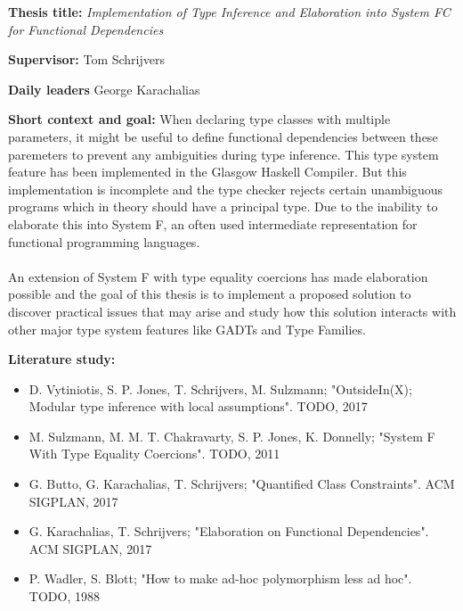 \documentclass[12pt]{report}
\begin{document}
\pagestyle{myheadings}

{\bf Thesis title:} {\em Implementation of Type Inference and Elaboration into System FC for Functional Dependencies}

\vspace{0.5cm}
{\bf Supervisor:} Tom Schrijvers


\vspace{0.5cm}
{\bf Daily leaders} George Karachalias

\vspace{1cm}
{\bf Short context and goal: }
When declaring type classes with multiple parameters, it might be useful to
define functional dependencies between these paremeters to prevent any
ambiguities during type inference. This type system feature has been implemented
in the Glasgow Haskell Compiler. But this implementation is incomplete and the
type checker rejects certain unambiguous programs which in theory should have a
principal type. Due to the inability to elaborate this into System F, an often
used intermediate representation for functional programming languages.

\paragraph{}
An extension of System F with type equality coercions has made elaboration
possible and the goal of this thesis is to implement a proposed solution to
discover practical issues that may arise and study how this solution interacts
with other major type system features like GADTs and Type Families.

\vspace{1cm}
{\bf Literature study:}
\begin{itemize} %
\item D. Vytiniotis, S. P. Jones, T. Schrijvers, M. Sulzmann; "OutsideIn(X);
    Modular type inference with local assumptions". TODO, 2017
\item M. Sulzmann, M. M. T. Chakravarty, S. P. Jones, K. Donnelly; "System F
    With Type Equality Coercions". TODO, 2011
\item G. Butto, G. Karachalias, T. Schrijvers; "Quantified Class Constraints".
    ACM SIGPLAN, 2017
\item G. Karachalias, T. Schrijvers; "Elaboration on Functional Dependencies".
    ACM SIGPLAN, 2017
\item P. Wadler, S. Blott; "How to make ad-hoc polymorphism less ad hoc". TODO, 1988
\end{itemize}
\end{document}
